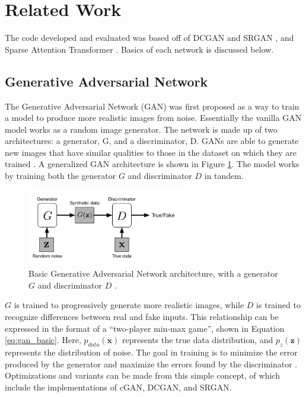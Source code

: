\documentclass[letterpaper]{article} %
\begin{document}
\section{Related Work}
The code developed and evaluated was based off of DCGAN
\cite{generative_adversarial_networks} and SRGAN
\cite{srgan}, and Sparse Attention Transformer
\cite{generative_transformers}.
Basics of each network is discussed below.

\subsection{Generative Adversarial Network}
The Generative Adversarial Network (GAN)
was first proposed as a way to train a model to produce more realistic images
from noise. Essentially the vanilla GAN model works as a random image generator.
The network is made up of two architectures:
a generator, G, and a discriminator, D.
GANs are able to generate new images that have similar qualities to
those in the dataset on which they are trained
\cite{generative_adversarial_networks}.
A generalized GAN architecture is shown in Figure \ref{fig:gan_architecture}.
The model works by training both the generator $G$ and
discriminator $D$ in tandem.

\begin{figure}[htbp]
\centerline{\includegraphics[width=7cm]{gan_architecture.png}}
\caption{Basic Generative Adversarial Network architecture, with a generator $G$
and discriminator $D$
\cite{cgan}.}
\label{fig:gan_architecture}
\end{figure}

$G$ is trained to progressively generate more realistic images,
while $D$ is trained to recognize differences between real and fake inputs.
This relationship can be expressed in the format of a
``two-player min-max game'', shown in Equation \ref{eq:gan_basic}.
Here, $p_{data}(\mathbf{x})$ represents the true data distribution,
and $p_{z}(\mathbf{z})$ represents the distribution of noise.
The goal in training is to minimize the error produced by the generator
and maximize the errors found by the discriminator \cite{cgan}.
Optimizations and variants can be made from this simple concept, of which include
the implementations of cGAN, DCGAN, and SRGAN.
\end{document}
